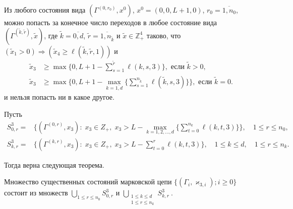 \documentclass[a4paper,12pt,russian]{extarticle}
\newcommand{\MarkThree}{\{(\Gamma_i, \varkappa_{3,i}); i \geqslant 0\}}
\begin{document}
\begin{lemma}
Из любого состояния вида $(\Gamma^{(0,r_0)},x^0)$, $x^0=(0,0,L+1,0)$, $r_0=\overline{1,n_0}$, можно попасть за конечное число переходов в любое состояние вида
$(\Gamma^{(\tilde{k},\tilde{r})},\tilde{x})$,
где $\tilde{k}=\overline{0,d}$, $\tilde{r} = \overline{1,n_{\tilde{k}}}$ и $\tilde{x}\in \mathbb{Z}_+^4$ таково, что  $(\tilde{x}_1>0) \Rightarrow (\tilde{x}_4\geqslant \ell(\tilde{k},\tilde{r},1))$ и 
\begin{align*}
\tilde{x}_3 &\geqslant \max{\{0,L+1-\sum_{s=1}^{\tilde{r}}\ell(k,s,3)\}}, \text{ если } \tilde{k}>0,\\
\tilde{x}_3&\geqslant \max{\{0,L+1-\max_{k=\overline{1,d}}{\{\sum_{s=1}^{n_{\tilde{k}}} \ell(\tilde{k},s,3)\}}\}}, \text{ если } \tilde{k}=0.
\end{align*}
и нельзя попасть ни в какое другое.
\end{lemma}

Пусть
\begin{align*}
  S^3_{0,r} = & 
  \biggl\{
  (\Gamma^{(0,r)},x_3) \colon \; x_3\in Z_+,\; x_3 > L - \max\limits_{k=1, 2,
    \ldots, d}
  \biggl\{ \sum_{t=0}^{n_k} \ell({k,t,3}) \biggl\}\biggl\}, 
  \quad 1 \leqslant r \leqslant n_0, \\
  S^3_{k,r} = & 
  \biggl\{
  (\Gamma^{(k,r)},x_3) \colon \; x_3\in Z_+,\; x_3 > L - \sum_{t=0}^{r} \ell({k,t,3})
  \biggr\}, 
  \quad 1 \leqslant k \leqslant d, \quad 1 \leqslant r \leqslant n_k.
\end{align*}

Тогда верна следующая теорема.
\begin{theorem}
Множество существенных состояний марковской цепи $\MarkThree$ состоит из множеств $\bigcup\limits_{1 \leqslant r \leqslant n_0}S^3_{0,r}$ и $\bigcup\limits_{\substack{1 \leqslant k \leqslant d\\ 1 \leqslant r \leqslant n_k}} S^3_{k,r}\:$.
\end{theorem}
\end{document}
